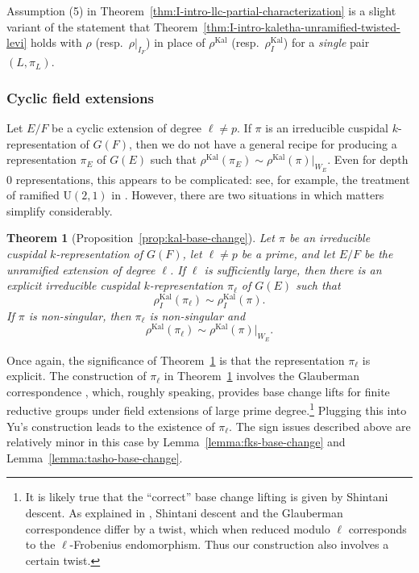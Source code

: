 \documentclass[reqno]{amsart}
\numberwithin{equation}{subsection}
\DeclareMathOperator{\Kal}{Kal}
\newtheorem{thm}{Theorem}[subsection]
\theoremstyle{remark}
\numberwithin{equation}{subsection}
\numberwithin{figure}{subsection}
\begin{document}
Assumption (5) in Theorem~\ref{thm:I-intro-llc-partial-characterization} is a slight variant of the statement that Theorem~\ref{thm:I-intro-kaletha-unramified-twisted-levi} holds with $\rho$ (resp.\ $\rho|_{I_F}$) in place of $\rho^{\Kal}$ (resp.\ $\rho_I^{\Kal}$) for a \emph{single} pair $(L, \pi_L)$.



\subsubsection{Cyclic field extensions}

Let $E/F$ be a cyclic extension of degree $\ell \neq p$. If $\pi$ is an irreducible cuspidal $k$-representation of $G(F)$, then we do not have a general recipe for producing a representation $\pi_E$ of $G(E)$ such that $\rho^{\Kal}(\pi_E) \sim \rho^{\Kal}(\pi)|_{W_E}$. Even for depth $0$ representations, this appears to be complicated: see, for example, the treatment of ramified $\mathrm{U}(2,1)$ in \cite[\S 7]{AL10}. However, there are two situations in which matters simplify considerably.

\begin{thm}[Proposition~\ref{prop:kal-base-change}]\label{thm:I-intro-large-bc}
    Let $\pi$ be an irreducible cuspidal $k$-representation of $G(F)$, let $\ell \neq p$ be a prime, and let $E/F$ be the unramified extension of degree $\ell$. If $\ell$ is sufficiently large, then there is an explicit irreducible cuspidal $k$-representation $\pi_\ell$ of $G(E)$ such that
    \[
    \rho_I^{\Kal}(\pi_\ell) \sim \rho_I^{\Kal}(\pi).
    \]
    If $\pi$ is non-singular, then $\pi_\ell$ is non-singular and
    \[
    \rho^{\Kal}(\pi_\ell) \sim \rho^{\Kal}(\pi)|_{W_E}.
    \]
\end{thm}

Once again, the significance of Theorem~\ref{thm:I-intro-large-bc} is that the representation $\pi_\ell$ is explicit. The construction of $\pi_\ell$ in Theorem~\ref{thm:I-intro-large-bc} involves the Glauberman correspondence \cite{Gla68}, which, roughly speaking, provides base change lifts for finite reductive groups under field extensions of large prime degree.\footnote{It is likely true that the ``correct'' base change lifting is given by Shintani descent. As explained in \cite[Remark~4.3.1]{Cot26b}, Shintani descent and the Glauberman correspondence differ by a twist, which when reduced modulo $\ell$ corresponds to the $\ell$-Frobenius endomorphism. Thus our construction also involves a certain twist.} Plugging this into Yu's construction leads to the existence of $\pi_\ell$. The sign issues described above are relatively minor in this case by Lemma~\ref{lemma:fks-base-change} and Lemma~\ref{lemma:tasho-base-change}.
\end{document}
